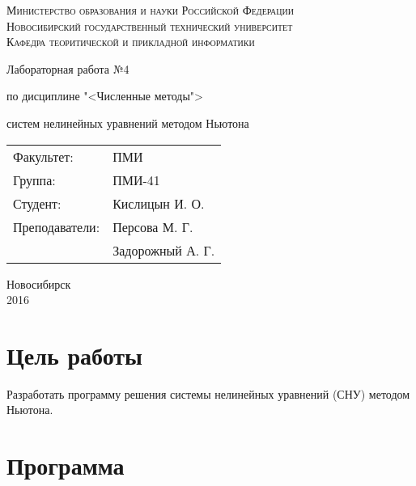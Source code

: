 \documentclass[oneside, final, 12pt]{extarticle}
\begin{document}
\begin{titlepage}
	\begin{centering}
		\textsc{Министерство образования и науки Российской Федерации}\\
		\textsc{Новосибирский государственный технический университет}\\
		\textsc{Кафедра теоритической и прикладной информатики}\\
	\end{centering}
	\vfill
	\vfill
	\vfill
	\Large
	\centerline{Лабораторная работа №4}
	\centerline{по дисциплине "<Численные методы">}
	\centerline{ систем нелинейных уравнений методом Ньютона}
	\normalsize
	\vfill
	\vfill
	\vfill
	\begin{flushleft}
		\begin{minipage}{0.3\textwidth}
			\begin{tabular}{l l}
				Факультет: & ПМИ\\
				Группа: & ПМИ-41\\
				Студент: & Кислицын И. О.\\
				Преподаватели: & Персова М. Г.\\
				~ & Задорожный А. Г. 
			\end{tabular}
		\end{minipage}
	\end{flushleft}
	\vfill
	\vfill
	\begin{centering}
		Новосибирск\\
		2016\\
	\end{centering}
\end{titlepage}
\setcounter{page}{2}
\lstset{
	breaklines=\true,
	basicstyle=\footnotesize\ttfamily,
	tabsize=2,
	showspaces=\false,
	breaklines=\true,
	breakatwhitespace=\true,
	extendedchars=\true,
	keepspaces=\true,
	language=Haskell
}
\section{Цель работы}

Разработать программу решения системы нелинейных уравнений (СНУ) методом Ньютона.

\section{Программа}

\lstset{caption=main.h}

\end{document}
